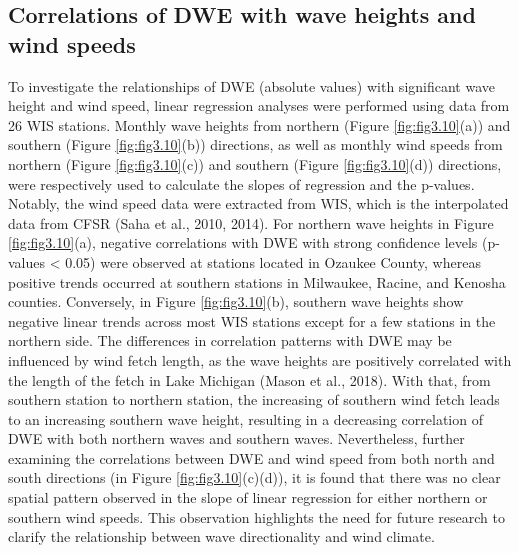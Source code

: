 \subsection{Correlations of DWE with wave heights and wind speeds}
\label{c3_Correlations of DWE with wave heights and wind speeds}
To investigate the relationships of DWE (absolute values) with significant wave height and wind speed, linear regression analyses were performed using data from 26 WIS stations. Monthly wave heights from northern (Figure \ref{fig:fig3.10}(a)) and southern (Figure \ref{fig:fig3.10}(b)) directions, as well as monthly wind speeds from northern (Figure \ref{fig:fig3.10}(c)) and southern (Figure \ref{fig:fig3.10}(d)) directions, were respectively used to calculate the slopes of regression and the p-values. Notably, the wind speed data were extracted from WIS, which is the interpolated data from CFSR (Saha et al., 2010, 2014). For northern wave heights in Figure \ref{fig:fig3.10}(a), negative correlations with DWE with strong confidence levels (p-values < 0.05) were observed at stations located in Ozaukee County, whereas positive trends occurred at southern stations in Milwaukee, Racine, and Kenosha counties. Conversely, in Figure \ref{fig:fig3.10}(b), southern wave heights show negative linear trends across most WIS stations except for a few stations in the northern side. The differences in correlation patterns with DWE may be influenced by wind fetch length, as the wave heights are positively correlated with the length of the fetch in Lake Michigan (Mason et al., 2018). With that, from southern station to northern station, the increasing of southern wind fetch leads to an increasing southern wave height, resulting in a decreasing correlation of DWE with both northern waves and southern waves. Nevertheless, further examining the correlations between DWE and wind speed from both north and south directions (in Figure \ref{fig:fig3.10}(c)(d)), it is found that there was no clear spatial pattern observed in the slope of linear regression for either northern or southern wind speeds. This observation highlights the need for future research to clarify the relationship between wave directionality and wind climate.

